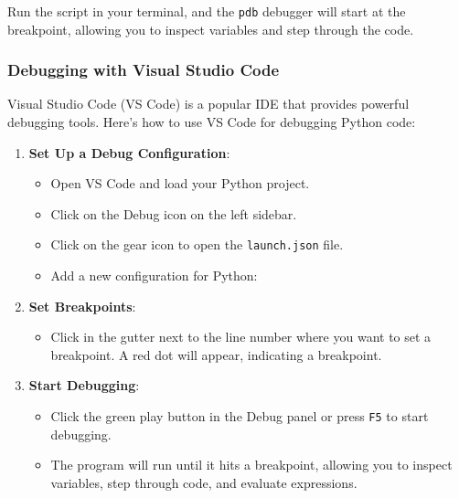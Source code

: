 \documentclass[
  letterpaper,
  DIV=11,
  numbers=noendperiod]{scrreprt}
\newenvironment{Shaded}{\begin{snugshade}}{\end{snugshade}}
\newcommand{\DataTypeTok}[1]{\textcolor[rgb]{0.68,0.00,0.00}{#1}}
\newcommand{\FunctionTok}[1]{\textcolor[rgb]{0.28,0.35,0.67}{#1}}
\newcommand{\StringTok}[1]{\textcolor[rgb]{0.13,0.47,0.30}{#1}}
\providecommand{\tightlist}{%
  \setlength{\itemsep}{0pt}\setlength{\parskip}{0pt}}\usepackage{longtable,booktabs,array}
\begin{document}
Run the script in your terminal, and the \texttt{pdb} debugger will
start at the breakpoint, allowing you to inspect variables and step
through the code.

\subsubsection{Debugging with Visual Studio
Code}\label{debugging-with-visual-studio-code}

Visual Studio Code (VS Code) is a popular IDE that provides powerful
debugging tools. Here's how to use VS Code for debugging Python code:

\begin{enumerate}
\def\labelenumi{\arabic{enumi}.}
\tightlist
\item
  \textbf{Set Up a Debug Configuration}:

  \begin{itemize}
  \item
    Open VS Code and load your Python project.
  \item
    Click on the Debug icon on the left sidebar.
  \item
    Click on the gear icon to open the \texttt{launch.json} file.
  \item
    Add a new configuration for Python:

\begin{Shaded}
\end{Shaded}
  \end{itemize}
\item
  \textbf{Set Breakpoints}:

  \begin{itemize}
  \tightlist
  \item
    Click in the gutter next to the line number where you want to set a
    breakpoint. A red dot will appear, indicating a breakpoint.
  \end{itemize}
\item
  \textbf{Start Debugging}:

  \begin{itemize}
  \tightlist
  \item
    Click the green play button in the Debug panel or press \texttt{F5}
    to start debugging.
  \item
    The program will run until it hits a breakpoint, allowing you to
    inspect variables, step through code, and evaluate expressions.
  \end{itemize}
\end{enumerate}
\end{document}
